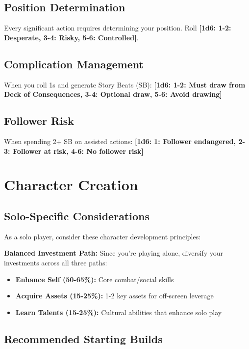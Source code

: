 \documentclass[11pt]{article}
\newcommand{\dice}[1]{\textbf{[1d6: #1]}}
\begin{document}
\subsection{Position Determination}

Every significant action requires determining your position. Roll \dice{1-2: Desperate, 3-4: Risky, 5-6: Controlled}.

\subsection{Complication Management}

When you roll 1s and generate Story Beats (SB):
\dice{1-2: Must draw from Deck of Consequences, 3-4: Optional draw, 5-6: Avoid drawing}

\subsection{Follower Risk}

When spending 2+ SB on assisted actions:
\dice{1: Follower endangered, 2-3: Follower at risk, 4-6: No follower risk}

\section{Character Creation}

\subsection{Solo-Specific Considerations}

As a solo player, consider these character development principles:

\begin{framed}
\textbf{Balanced Investment Path:} Since you're playing alone, diversify your investments across all three paths:
\begin{itemize}
    \item \textbf{Enhance Self (50-65\%):} Core combat/social skills
    \item \textbf{Acquire Assets (15-25\%):} 1-2 key assets for off-screen leverage
    \item \textbf{Learn Talents (15-25\%):} Cultural abilities that enhance solo play
\end{itemize}
\end{framed}

\subsection{Recommended Starting Builds}
\end{document}
